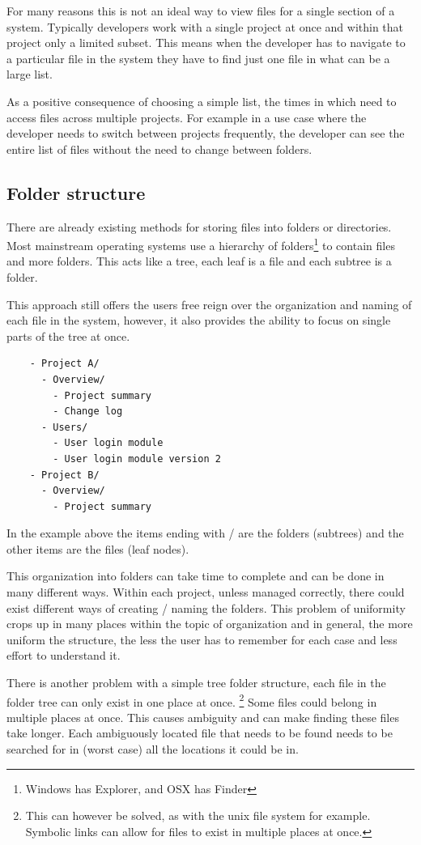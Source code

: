 For many reasons this is not an ideal way to view files for a single section of a system. Typically developers work with a single project at once and within that project only a limited subset. This means when the developer has to navigate to a particular file in the system they have to find just one file in what can be a large list.


As a positive consequence of choosing a simple list, the times in which need to
access files across multiple projects. For example in a use case where the developer
needs to switch between projects frequently, the developer can see the
entire list of files without the need to change between folders.

\subsection{Folder structure}\label{folder-structure-i.e.explorer-finder}

There are already existing methods for storing files into folders or
directories. Most mainstream operating systems use a hierarchy of
folders\footnote{Windows has Explorer, and OSX has Finder} to contain files
and more folders. This acts like a tree, each leaf is a file and each subtree
is a folder.

This approach still offers the users free reign over the organization
and naming of each file in the system, however, it also provides the
ability to focus on single parts of the tree at once.

\begin{verbatim}
    - Project A/
      - Overview/
        - Project summary
        - Change log
      - Users/
        - User login module
        - User login module version 2
    - Project B/
      - Overview/
        - Project summary
\end{verbatim}

In the example above the items ending with / are the folders (subtrees) and the
other items are the files (leaf nodes).

This organization into folders can take time to complete and can be done in many
different ways. Within each project, unless managed correctly, there could exist
different ways of creating / naming the folders. This problem of uniformity
crops up in many places within the topic of organization and in general, the
more uniform the structure, the less the user has to remember for each case and
less effort to understand it.

There is another problem with a simple tree folder structure, each file in the
folder tree can only exist in one place at once.%
%
\footnote{This can however be solved, as with the unix file system for example.
Symbolic links can allow for files to exist in multiple places at once. } Some
files could belong in multiple places at once. This causes ambiguity and can
make finding these files take longer. Each ambiguously located file that needs
to be found needs to be searched for in (worst case) all the locations it could
be in.

